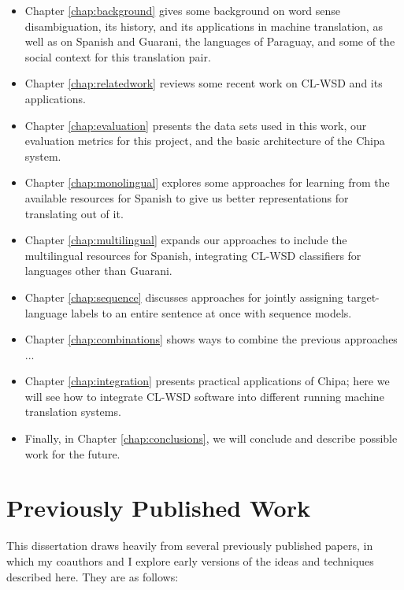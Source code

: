 \begin{itemize}
\item Chapter \ref{chap:background} gives some background on word sense
disambiguation, its history, and its applications in machine translation, as
well as on Spanish and Guarani, the languages of Paraguay, and some of the
social context for this translation pair.
\item Chapter \ref{chap:relatedwork} reviews some recent work on CL-WSD and its
applications.
\item Chapter \ref{chap:evaluation} presents the data sets used in this work,
our evaluation metrics for this project, and the basic architecture of the
Chipa system.
\item Chapter \ref{chap:monolingual} explores some approaches for learning from
the available resources for Spanish to give us better representations for
translating out of it.
\item Chapter \ref{chap:multilingual} expands our approaches to include the
multilingual resources for Spanish, integrating CL-WSD classifiers for
languages other than Guarani.
\item Chapter \ref{chap:sequence} discusses approaches for jointly assigning
target-language labels to an entire sentence at once with sequence models.
\item Chapter \ref{chap:combinations} shows ways to combine the previous
approaches ... %
\item Chapter \ref{chap:integration} presents practical applications of Chipa;
here we will see how to integrate CL-WSD software into different running
machine translation systems.
\item Finally, in Chapter \ref{chap:conclusions}, we will conclude and describe
possible work for the future.
\end{itemize}

\section{Previously Published Work}
This dissertation draws heavily from several previously published papers, in
which my coauthors and I explore early versions of the ideas and techniques
described here. They are as follows:

